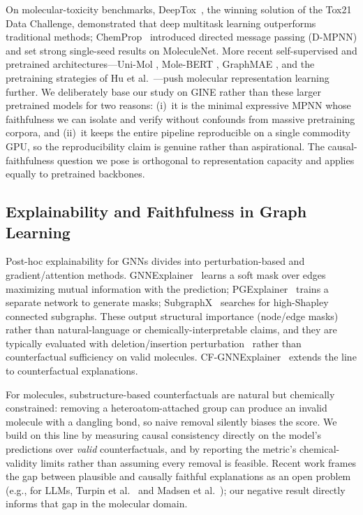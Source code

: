 \documentclass[journal]{IEEEtran}
\begin{document}
On molecular-toxicity benchmarks, DeepTox~\cite{mayr2016deeptox}, the winning
solution of the Tox21 Data Challenge, demonstrated that deep multitask learning
outperforms traditional methods; ChemProp~\cite{yang2019analyzing} introduced
directed message passing (D-MPNN) and set strong single-seed results on
MoleculeNet. More recent self-supervised and pretrained architectures---Uni-Mol
\cite{zhou2022unimol}, Mole-BERT \cite{xia2023molebert}, GraphMAE
\cite{zhang2022graphmae}, and the pretraining strategies of Hu et
al.~\cite{hu2020strategies}---push molecular representation learning further. We
deliberately base our study on GINE rather than these larger pretrained models
for two reasons: (i)~it is the minimal expressive MPNN whose faithfulness we can
isolate and verify without confounds from massive pretraining corpora, and
(ii)~it keeps the entire pipeline reproducible on a single commodity GPU, so the
reproducibility claim is genuine rather than aspirational. The causal-faithfulness
question we pose is orthogonal to representation capacity and applies equally to
pretrained backbones.

\subsection{Explainability and Faithfulness in Graph Learning}
Post-hoc explainability for GNNs divides into perturbation-based and
gradient/attention methods. GNNExplainer~\cite{ying2019gnnexplainer} learns a
soft mask over edges maximizing mutual information with the prediction;
PGExplainer~\cite{luo2020parameterized} trains a separate network to generate
masks; SubgraphX~\cite{yuan2021explainability} searches for high-Shapley connected
subgraphs. These output structural importance (node/edge masks) rather than
natural-language or chemically-interpretable claims, and they are typically
evaluated with deletion/insertion perturbation~\cite{deyoung2020eraser} rather than
counterfactual sufficiency on valid molecules. CF-GNNExplainer~\cite{lucic2022cfgnnexplainer}
extends the line to counterfactual explanations.

For molecules, substructure-based counterfactuals are natural but chemically
constrained: removing a heteroatom-attached group can produce an invalid molecule
with a dangling bond, so naive removal silently biases the score. We build on this
line by measuring causal consistency directly on the model's predictions over
\emph{valid} counterfactuals, and by reporting the metric's chemical-validity
limits rather than assuming every removal is feasible. Recent work frames the gap
between plausible and causally faithful explanations as an open problem (e.g., for
LLMs, Turpin et al.~\cite{turpin2023language} and Madsen et
al.~\cite{madsen2024selfexplanations}); our negative result directly informs that
gap in the molecular domain.
\end{document}
